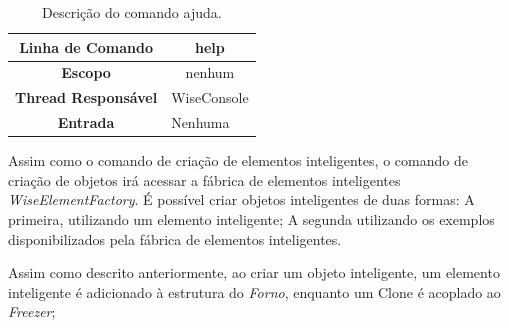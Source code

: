 \documentclass[10pt,aspectratio=169]{beamer}
\theoremstyle{remark}
\theoremstyle{definition}
\begin{document}
\begin{frame}[allowframebreaks]
	
	\begin{center}
		\begin{table}[!htbp]
			\begin{tabular}{|c|m{}|}
				\hline
				\textbf{Linha de Comando} & \multicolumn{1}{c|}{help} \\
				\hline
				\textbf{Escopo} & \multicolumn{1}{c|}{nenhum} \\
				\hline
				\textbf{Thread Responsável} & \multicolumn{1}{c|}{WiseConsole} \\
				\hline
				\textbf{Entrada} & Nenhuma \\
				\hline
			\end{tabular}
			\caption{Descrição do comando ajuda.}
			\label{tab:help}
		\end{table}
	\end{center}

	\framebreak

	Assim como o comando de criação de elementos inteligentes, o comando de criação de objetos irá acessar a fábrica de elementos inteligentes \textit{WiseElementFactory}. É possível criar objetos inteligentes de duas formas: A primeira, utilizando um elemento inteligente; A segunda utilizando os exemplos disponibilizados pela fábrica de elementos inteligentes.
	
	Assim como descrito anteriormente, ao criar um objeto inteligente, um elemento inteligente é adicionado à estrutura do \textit{Forno}, enquanto um Clone é acoplado ao \textit{Freezer};
	

\end{frame}
\end{document}
